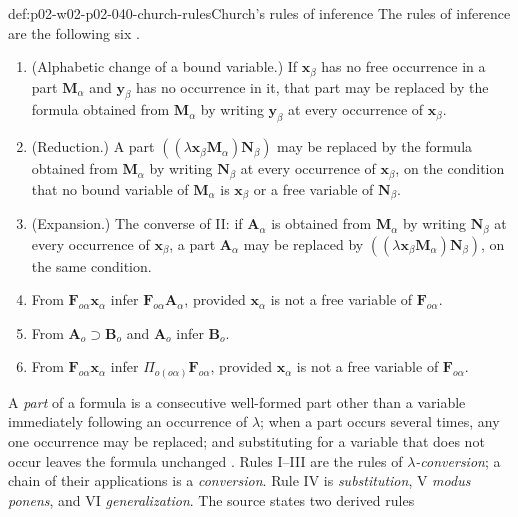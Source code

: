 \begin{hbdefinition}{def:p02-w02-p02-040-church-rules}{Church's rules of inference}
The rules of inference are the following six \cite[\S3, p.~60]{Church1940}.
\begin{enumerate}
 \item[I.] (Alphabetic change of a bound variable.)  If
   \(\mathbf x_\beta\) has no free occurrence in a part \(\mathbf M_\alpha\) and
   \(\mathbf y_\beta\) has no occurrence in it, that part may be replaced by
   the formula obtained from \(\mathbf M_\alpha\) by writing
   \(\mathbf y_\beta\) at every occurrence of \(\mathbf x_\beta\).
 \item[II.] (Reduction.)  A part
   \(((\lambda\mathbf x_\beta\mathbf M_\alpha)\mathbf N_\beta)\) may be replaced
   by the formula obtained from \(\mathbf M_\alpha\) by writing
   \(\mathbf N_\beta\) at every occurrence of \(\mathbf x_\beta\), on the
   condition that no bound variable of \(\mathbf M_\alpha\) is
   \(\mathbf x_\beta\) or a free variable of \(\mathbf N_\beta\).
 \item[III.] (Expansion.)  The converse of II: if \(\mathbf A_\alpha\) is
   obtained from \(\mathbf M_\alpha\) by writing \(\mathbf N_\beta\) at every
   occurrence of \(\mathbf x_\beta\), a part \(\mathbf A_\alpha\) may be
   replaced by \(((\lambda\mathbf x_\beta\mathbf M_\alpha)\mathbf N_\beta)\),
   on the same condition.
 \item[IV.] From \(\mathbf F_{o\alpha}\mathbf x_\alpha\) infer
   \(\mathbf F_{o\alpha}\mathbf A_\alpha\), provided \(\mathbf x_\alpha\) is not
   a free variable of \(\mathbf F_{o\alpha}\).
 \item[V.] From \(\mathbf A_o\supset\mathbf B_o\) and \(\mathbf A_o\) infer
   \(\mathbf B_o\).
 \item[VI.] From \(\mathbf F_{o\alpha}\mathbf x_\alpha\) infer
   \(\Pi_{o(o\alpha)}\mathbf F_{o\alpha}\), provided \(\mathbf x_\alpha\) is
   not a free variable of \(\mathbf F_{o\alpha}\).
\end{enumerate}
A \emph{part} of a formula is a consecutive well-formed part other than a
variable immediately following an occurrence of \(\lambda\); when a part
occurs several times, any one occurrence may be replaced; and substituting
for a variable that does not occur leaves the formula unchanged
\cite[\S3, p.~60]{Church1940}.  Rules I--III are the rules of
\emph{\(\lambda\)-conversion}; a chain of their applications is a
\emph{conversion}.  Rule IV is \emph{substitution}, V \emph{modus ponens},
and VI \emph{generalization}.  The source states two derived rules

\end{hbdefinition}
